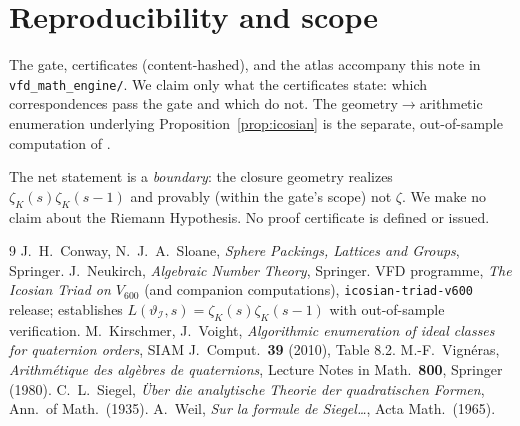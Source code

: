 \documentclass[11pt]{article}
\theoremstyle{definition}
\newcommand{\zetaK}{\zeta_{K}}
\newcommand{\Icos}{\mathcal{I}}
\renewcommand{\Theta}{\vartheta}
\begin{document}
\section{Reproducibility and scope}
The gate, certificates (content-hashed), and the atlas accompany this note in
\texttt{vfd\_math\_engine/}. We claim only what the certificates state: which
correspondences pass the gate and which do not. The geometry$\to$arithmetic enumeration
underlying Proposition~\ref{prop:icosian} is the separate, out-of-sample computation of
\cite{IcosianTriad}.

The net statement is a \emph{boundary}: the closure geometry realizes
$\zetaK(s)\zetaK(s-1)$ and provably (within the gate's scope) not $\zeta$. We make no
claim about the Riemann Hypothesis. No proof certificate is defined or issued.

\begin{thebibliography}{9}
 J.~H.~Conway, N.~J.~A.~Sloane, \emph{Sphere Packings, Lattices
  and Groups}, Springer.
 J.~Neukirch, \emph{Algebraic Number Theory}, Springer.
 VFD programme, \emph{The Icosian Triad on $V_{600}$} (and
  companion computations), \texttt{icosian-triad-v600} release; establishes
  $L(\Theta_{\Icos},s)=\zetaK(s)\zetaK(s-1)$ with out-of-sample verification.
 M.~Kirschmer, J.~Voight, \emph{Algorithmic enumeration of
  ideal classes for quaternion orders}, SIAM J.\ Comput.\ \textbf{39} (2010), Table 8.2.
 M.-F.~Vign\'eras, \emph{Arithm\'etique des alg\`ebres de
  quaternions}, Lecture Notes in Math.\ \textbf{800}, Springer (1980).
 C.~L.~Siegel, \emph{\"Uber die analytische Theorie der quadratischen
  Formen}, Ann.\ of Math.\ (1935).
 A.~Weil, \emph{Sur la formule de Siegel\dots}, Acta Math.\ (1965).
\end{thebibliography}
\end{document}
